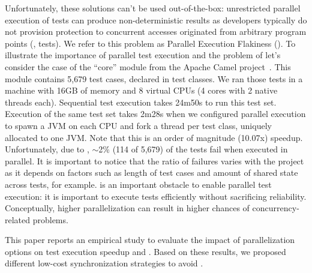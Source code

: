 Unfortunately, these solutions can't be used out-of-the-box:
unrestricted parallel execution of tests can produce non-deterministic
results as developers typically do not provision protection to
concurrent accesses originated from arbitrary program points (\ie{},
tests).  We refer to this problem as Parallel Execution Flakiness
(\pef{}).  To illustrate the importance of parallel test execution and
the problem of \pef{} let's consider the case of the ``core'' module
from the Apache Camel project~\cite{apache-camel-web}.  This module
contains 5,679 test cases, declared in  test classes.  We ran
those tests in a machine with 16GB of memory and 8 virtual CPUs (4
cores with 2 native threads each).  Sequential test execution takes
24m50s to run this test set.  Execution of the same test set takes
2m28s when we configured parallel execution to spawn a JVM on each CPU
and fork a thread per test class, uniquely allocated to one JVM.  Note
that this is an order of magnitude (10.07x) speedup.
Unfortunately, due to \pef{}, $\sim$2\% (114 of 5,679) of the tests
fail when executed in parallel.  It is important to notice that the
ratio of failures varies with the project as it depends on factors
such as length of test cases and amount of shared state across tests,
for example.  \pef{} is an important obstacle to enable parallel test
execution: it is important to execute tests efficiently without
sacrificing reliability.  Conceptually, higher parallelization can
result in higher chances of concurrency-related problems.  

This paper reports an empirical study to evaluate the impact of
parallelization options on test execution speedup and \pef{}. Based on
these results, we proposed different low-cost synchronization
strategies to avoid \pef{}.


